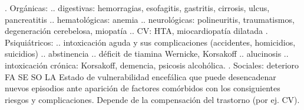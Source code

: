 . Orgánicas:
.. digestivas: hemorragias, esofagitis, gastritis, cirrosis, ulcus, pancreatitis
.. hematológicas: anemia
.. neurológicas: polineuritis, traumatismos, degeneración cerebelosa, miopatía
.. CV: HTA, miocardiopatía dilatada
. Psiquiátricos:
.. intoxicación aguda y sus complicaciones (accidentes, homicidios, suicidios)
.. abstinencia
.. déficit de tiamina Wernicke, Korsakoff
.. alucinosis
.. intoxicación crónica: Korsakoff, demencia, psicosis alcohólica.
. Sociales: deterioro FA SE SO LA Estado de vulnerabilidad encefálica que puede desencadenar nuevos episodios ante aparición de factores comórbidos con los consiguientes riesgos y complicaciones. Depende de la compensación del trastorno (por ej. CV).
\printbibliography[]
